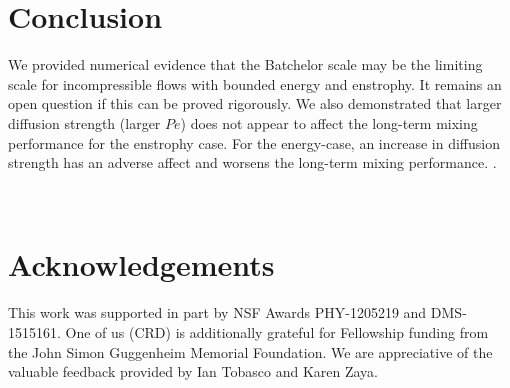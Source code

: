 \documentclass{jfm}
\newcommand{\ddt}[1]{\frac{d #1}{dt}}
\newcommand{\hmone}[1]{\|\nabla^{-1} #1\|_{L^{2}}}
\newcommand{\ltwo}[1]{\|#1\|_{L^{2}}}
\newcommand{\hone}[1]{\| \nabla #1\|_{L^{2}}}
\renewcommand{\vec}[1]{\mathbf{#1}}
\newcommand{\linf}[1]{\| #1 \|_{L^{\infty}}}
\newcommand{\tavg}[1]{\langle  #1 \rangle}
\renewcommand{\u}{\mathbf{u}}
\begin{document}
\section{Conclusion}
\label{sec:conclusion}
We provided numerical evidence that the Batchelor scale may be the limiting scale for incompressible flows with bounded energy and enstrophy. It remains an open question if this can be proved rigorously. We also demonstrated that larger diffusion strength (larger $Pe$)  does not appear to affect the long-term mixing performance for the enstrophy case. For the energy-case, an increase in diffusion strength has an adverse affect and worsens the long-term mixing performance. .




%
%
%
%
\
\section*{Acknowledgements}

This work was supported in part by NSF Awards PHY-1205219 and DMS-1515161. One of us (CRD) is additionally grateful for Fellowship funding from the John Simon Guggenheim Memorial Foundation. We are appreciative of the valuable feedback provided by Ian Tobasco and Karen Zaya.
\end{document}
